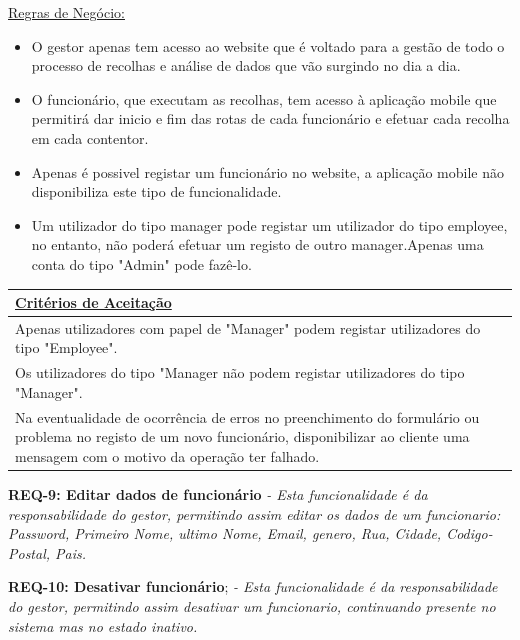 \documentclass{scrreprt}
\begin{document}
		\underline{Regras de Negócio: } 
		\begin{itemize}
		\item O gestor apenas tem acesso ao website que é voltado para a gestão de todo o processo de recolhas e análise de dados que vão surgindo no dia a dia.
		\item O funcionário, que executam as recolhas, tem acesso à aplicação mobile que permitirá dar inicio e fim das rotas de cada funcionário e efetuar cada recolha em cada contentor.
		\item Apenas é possivel registar um funcionário no website, a aplicação mobile não disponibiliza este tipo de funcionalidade.
		\item Um utilizador do tipo manager pode registar um utilizador do tipo employee, no entanto, não poderá efetuar um registo de outro manager.Apenas uma conta do tipo "Admin" pode fazê-lo.
    	\end{itemize}
		
		\begin{tabular}{|p{5.2in}|p{0.7in}|} \hline 
		\underline{Critérios de Aceitação} \\ \hline 
		Apenas utilizadores com papel de "Manager" podem registar utilizadores do tipo "Employee". \\ \hline 
		Os utilizadores do tipo "Manager não podem registar utilizadores do tipo "Manager".\\ \hline
		Na eventualidade de ocorrência de erros no preenchimento do formulário ou problema no registo de um novo funcionário, disponibilizar ao cliente uma mensagem com o motivo da operação ter falhado.\\ \hline
	\end{tabular}\newline\newline
	
	\textbf{REQ-9: Editar dados de funcionário}\newline
	    \textit{- Esta funcionalidade é da responsabilidade do gestor, permitindo assim editar os dados de um funcionario: Password, Primeiro Nome, ultimo Nome, Email, genero, Rua, Cidade, Codigo-Postal, Pais.}\newline\newline
	    
	\textbf{REQ-10: Desativar funcionário};\newline
	    \textit{- Esta funcionalidade é da responsabilidade do gestor, permitindo assim desativar um funcionario, continuando presente no sistema mas no estado inativo.}\newline\newline
		
\end{document}
